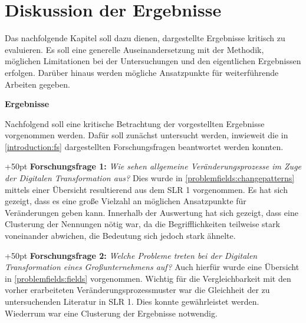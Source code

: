 \chapter{Diskussion der Ergebnisse}
\label{evaluation}


Das nachfolgende Kapitel soll dazu dienen, dargestellte Ergebnisse kritisch zu evaluieren. Es soll eine generelle Auseinandersetzung mit der Methodik, möglichen Limitationen bei der Untersuchungen und den eigentlichen Ergebnissen erfolgen. Darüber hinaus werden mögliche Ansatzpunkte für weiterführende Arbeiten gegeben.

\textbf{Ergebnisse}

Nachfolgend soll eine kritische Betrachtung der vorgestellten Ergebnisse vorgenommen werden. Dafür soll zunächst untersucht werden, inwieweit die in \ref{introduction:fs} dargestellten Forschungsfragen beantwortet werden konnten. 

\hangindent+50pt 
\textbf{Forschungsfrage 1:}\textit{ Wie sehen allgemeine Veränderungsprozesse im Zuge der Digitalen Transformation aus?} Dies wurde in  \ref{problemfields:changepatterns} mittels einer Übersicht resultierend aus dem SLR 1 vorgenommen. Es hat sich gezeigt, dass es eine große Vielzahl an möglichen Ansatzpunkte für Veränderungen geben kann. Innerhalb der Auswertung hat sich gezeigt, dass eine Clusterung der Nennungen nötig war, da die Begrifflichkeiten teilweise stark voneinander abwichen, die Bedeutung sich jedoch stark ähnelte.  

\hangindent+50pt 
\textbf{Forschungsfrage 2:} \textit{Welche Probleme treten bei der Digitalen Transformation eines Großunternehmens auf?} Auch hierfür wurde eine Übersicht in \ref{problemfields:fields} vorgenommen. Wichtig für die Vergleichbarkeit mit den vorher erarbeiteten Veränderungsprozessmuster war die Gleichheit der zu untersuchenden Literatur in SLR 1. Dies konnte gewährleistet werden. Wiederrum war eine Clusterung der Ergebnisse notwendig.

